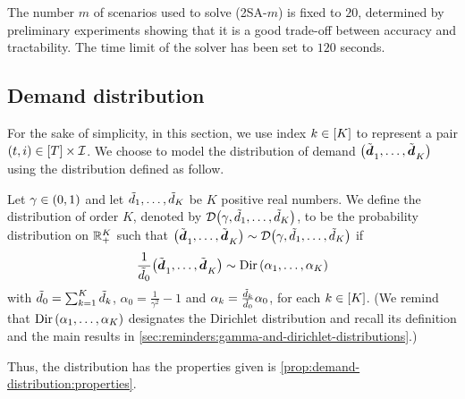 The number $m$ of scenarios used to solve (2SA-$m$) is fixed to $20$, determined by preliminary experiments showing that it is a good trade-off between accuracy and tractability.
The time limit of the solver has been set to $120$ seconds.




\subsection{Demand distribution}
\label{sec:PDP:numerical-experiments:drawing-realization-of-demand}


For the sake of simplicity, in this section, we use index $k\in\range{K}$ to represent a pair $(t,i)\in\range{\horizon}\times\REF$.
We choose to model the distribution of demand $\bracket{\tilde{\va\demand}_1,\ldots,\tilde{\va\demand}_K}$ using the \distrib distribution defined as follow.


Let $\gamma\in\bracket{0,1}$ and let $\tilde{d}_1,\ldots,\tilde{d}_K$ be $K$ positive real numbers. 
We define the \distrib distribution of order $K$, denoted by $\cD\bracket{\gamma,\tilde{\demand}_1,\ldots,\tilde{\demand}_K}$, to be the probability distribution on $\mathbb{R}_+^K$ such that $\bracket{\tilde{\va\demand}_1,\ldots,\tilde{\va\demand}_K}\sim\cD\bracket{\gamma,\tilde{\demand}_1,\ldots,\tilde{\demand}_K}$ if 
\begin{equation}
  \frac{1}{\tilde{\demand}_0}\bracket{\tilde{\va\demand}_1,\ldots,\tilde{\va\demand}_K}\sim\Dir\bracket{\alpha_1,\ldots,\alpha_K}
\end{equation}
with $\tilde{d}_0=\sum_{k=1}^K\tilde{d}_k$, $\alpha_0=\frac{1}{\gamma^2}-1$ and $\alpha_k=\frac{\tilde{d}_k}{\tilde{d}_0}\alpha_0$, for each $k\in\range{K}$.
(We remind that $\Dir\bracket{\alpha_1,\ldots,\alpha_K}$ designates the Dirichlet distribution and recall its definition and the main results in \cref{sec:reminders:gamma-and-dirichlet-distributions}.)


Thus, the \distrib distribution has the properties given is \cref{prop:demand-distribution:properties}.


